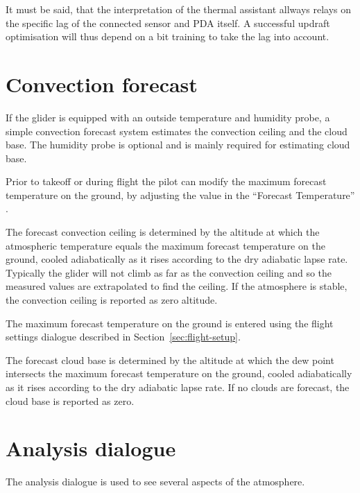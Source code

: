 It must be said, that the interpretation of the thermal assistant allways relays
on the specific lag of the connected sensor and PDA itself. A successful
updraft optimisation will thus depend on a bit training to take the lag into account.


\section{Convection forecast}\label{sec:convection-forecast}

If the glider is equipped with an outside temperature and humidity
probe, a simple convection forecast system estimates the convection
ceiling and the cloud base.  The humidity probe is optional and is
mainly required for estimating cloud base.

Prior to takeoff or during flight the pilot can modify the maximum
forecast temperature on the ground, by adjusting the value in the
``Forecast Temperature'' {\InfoBox}.

The forecast convection ceiling is determined by the altitude at which
the atmospheric temperature equals the maximum forecast temperature on
the ground, cooled adiabatically as it rises according to the dry
adiabatic lapse rate.  Typically the glider will not climb as far as
the convection ceiling and so the measured values are extrapolated to
find the ceiling.  If the atmosphere is stable, the convection ceiling
is reported as zero altitude.

The maximum forecast temperature on the ground is entered using the
flight settings dialogue described in Section~\ref{sec:flight-setup}.


%

The forecast cloud base is determined by the altitude at which the dew
point intersects the maximum forecast temperature on the ground,
cooled adiabatically as it rises according to the dry adiabatic lapse
rate.  If no clouds are forecast, the cloud base is reported as zero.


\section{Analysis dialogue}

The analysis dialogue is used to see several aspects of the atmosphere.

